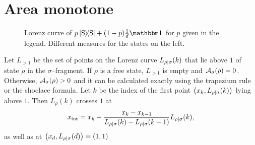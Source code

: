 \documentclass[pra,
aps,
twocolumn,
superscriptaddress,
groupedaddress,
nofootinbib,
reprint
]{revtex4-1}
\begin{document}
\null\newpage

\section{Area monotone}\label{app:areamono}


\begin{figure}[h]%
    \centering
    \hspace{8pt}%
    \caption{ Lorenz curve of $p\ketbra{\rm{S}} + (1-p) \frac{1}{d}\id$ for $p$ given in the legend. Different measures for the states on the left. \\
    }%
    \label{fig:test}
\end{figure}

Let $L_{>1}$ be the set of points on the Lorenz curve ${L_{\rho|\sigma}}(k)$ that lie above $1$ of state $\rho$ in the $\sigma$--fragment. 
If $\rho$ is a free state, $L_{>1}$ is empty and ${\mathcal A}_\sigma(\rho) = 0$. 
Otherwise, ${\mathcal A}_\sigma(\rho) > 0$ and it can be calculated exactly using the trapezium rule or the shoelace formula. 
Let $k$ be the index of the first point $\left(x_k, {L_{\rho|\sigma}}(k)\right)$ lying above $1$. 
Then $L_\rho(k)$ crosses $1$ at
\begin{equation}
	x_{\rm{int}} = x_k - \frac{x_k - x_{k-1}}{\lc{\rho}{\sigma}(k) - \lc{\rho}{\sigma}(k-1)}\lc{\rho}{\sigma}(k),\vspace{10pt}
\end{equation}
as well as at $\left(x_d, {L_{\rho|\sigma}}(d)\right) = (1,1)$
\end{document}

